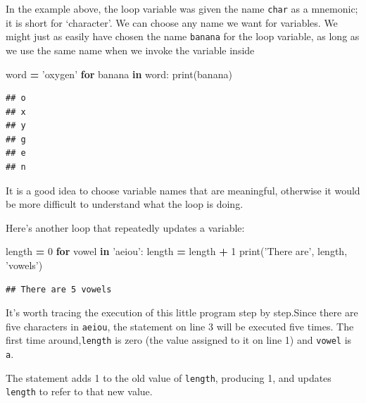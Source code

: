 \documentclass[]{book}
\newenvironment{Shaded}{\begin{snugshade}}{\end{snugshade}}
\newcommand{\BuiltInTok}[1]{#1}
\newcommand{\ControlFlowTok}[1]{\textcolor[rgb]{0.13,0.29,0.53}{\textbf{#1}}}
\newcommand{\DecValTok}[1]{\textcolor[rgb]{0.00,0.00,0.81}{#1}}
\newcommand{\KeywordTok}[1]{\textcolor[rgb]{0.13,0.29,0.53}{\textbf{#1}}}
\newcommand{\NormalTok}[1]{#1}
\newcommand{\OperatorTok}[1]{\textcolor[rgb]{0.81,0.36,0.00}{\textbf{#1}}}
\newcommand{\StringTok}[1]{\textcolor[rgb]{0.31,0.60,0.02}{#1}}
\theoremstyle{definition}
\theoremstyle{definition}
\theoremstyle{definition}
\theoremstyle{remark}
\begin{document}
In the example above, the loop variable was given the name \texttt{char}
as a mnemonic; it is short for `character'. We can choose any name we
want for variables. We might just as easily have chosen the name
\texttt{banana} for the loop variable, as long as we use the same name
when we invoke the variable inside

\begin{Shaded}
\begin{Highlighting}[]
\NormalTok{word }\OperatorTok{=} \StringTok{'oxygen'}
\ControlFlowTok{for}\NormalTok{ banana }\KeywordTok{in}\NormalTok{ word:}
    \BuiltInTok{print}\NormalTok{(banana)}
\end{Highlighting}
\end{Shaded}

\begin{verbatim}
## o
## x
## y
## g
## e
## n
\end{verbatim}

It is a good idea to choose variable names that are meaningful,
otherwise it would be more difficult to understand what the loop is
doing.

Here's another loop that repeatedly updates a variable:

\begin{Shaded}
\begin{Highlighting}[]
\NormalTok{length }\OperatorTok{=} \DecValTok{0}
\ControlFlowTok{for}\NormalTok{ vowel }\KeywordTok{in} \StringTok{'aeiou'}\NormalTok{:}
\NormalTok{    length }\OperatorTok{=}\NormalTok{ length }\OperatorTok{+} \DecValTok{1}
\BuiltInTok{print}\NormalTok{(}\StringTok{'There are'}\NormalTok{, length, }\StringTok{'vowels'}\NormalTok{)}
\end{Highlighting}
\end{Shaded}

\begin{verbatim}
## There are 5 vowels
\end{verbatim}

It's worth tracing the execution of this little program step by
step.Since there are five characters in
\texttt{\textquotesingle{}aeiou\textquotesingle{}}, the statement on
line 3 will be executed five times. The first time
around,\texttt{length} is zero (the value assigned to it on line 1) and
\texttt{vowel} is \texttt{\textquotesingle{}a\textquotesingle{}}.

The statement adds 1 to the old value of \texttt{length}, producing 1,
and updates \texttt{length} to refer to that new value.
\end{document}
